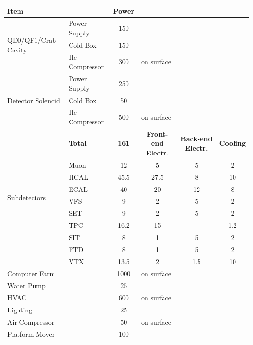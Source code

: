 \begin{table}[htb]
    \centering
    \begin{tabular}{l|l|c|c|c|c}
       \multicolumn{2}{l|}{{\bf Item}} & {\bf Power} &\multicolumn{3}{c}{ } \\ \hline
        \multirow{3}{*}{QD0/QF1/Crab Cavity} & Power Supply  & 150 & \multicolumn{3}{l}{ } \\
                            & Cold Box      & 150 & \multicolumn{3}{l}{ } \\
                            & He Compressor & 300 & \multicolumn{3}{l}{on surface}\\ \hline
        \multirow{3}{*}{Detector Solenoid} & Power Supply  & 250 & \multicolumn{3}{l}{ } \\
                            & Cold Box      & 50 & \multicolumn{3}{l}{ } \\
                            & He Compressor & 500 & \multicolumn{3}{l}{on surface}\\ \hline                      
        \multirow{10}{*}{Subdetectors} & {\bf Total}  & {\bf 161} & {\bf Front-end Electr.} & {\bf Back-end Electr.} & {\bf Cooling}\\ \cline{2-6}
        & Muon  & 12 & 5 & 5  & 2 \\
        & HCAL  & 45.5 & 27.5 & 8 & 10 \\
        & ECAL  & 40 & 20 & 12 & 8 \\
        & VFS   & 9 & 2 & 5 & 2 \\
        & SET   & 9 & 2 & 5 & 2 \\
        & TPC   & 16.2 & 15 & - & 1.2 \\
        & SIT   & 8 & 1 & 5 & 2 \\
        & FTD   & 8 & 1 & 5 & 2 \\
        & VTX   & 13.5 & 2 & 1.5 & 10 \\\hline
        \multicolumn{2}{l|}{Computer Farm}& 1000 & \multicolumn{3}{l}{on surface}\\ \hline
        \multicolumn{2}{l|}{Water Pump}& 25 & \multicolumn{3}{l}{}\\ \hline
        \multicolumn{2}{l|}{HVAC}& 600 & \multicolumn{3}{l}{on surface}\\ \hline
        \multicolumn{2}{l|}{Lighting}& 25 & \multicolumn{3}{l}{}\\ \hline
        \multicolumn{2}{l|}{Air Compressor}& 50 & \multicolumn{3}{l}{on surface}\\ \hline
        \multicolumn{2}{l|}{Platform Mover}& 100 & \multicolumn{3}{l}{}\\ \hline

\end{tabular}
\end{table}
